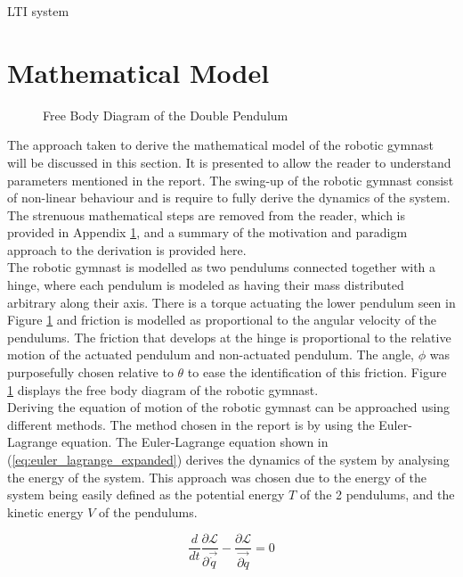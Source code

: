 LTI system


\section{Mathematical Model}
\label{sec:math_model}
\begin{figure}[h]
	\centering
	
	\caption{Free Body Diagram of the Double Pendulum}
	\label{fig:doublePen}
\end{figure}

The approach taken to derive the mathematical model of the robotic gymnast will be discussed in this section. It is presented to allow the reader to understand parameters mentioned in the report. The swing-up of the robotic gymnast consist of non-linear behaviour and is require to fully derive the dynamics of the system. The strenuous mathematical steps are removed from the reader, which is provided in Appendix \ref{sec:math_model}, and a summary of the motivation and paradigm approach to the derivation is provided here.\\

The robotic gymnast is modelled as two pendulums connected together with a hinge, where each pendulum is modeled as having their mass distributed arbitrary along their axis. There is a torque actuating the lower pendulum seen in Figure \ref{fig:doublePen} and friction is modelled as proportional to the angular velocity of the pendulums. The friction that develops at the hinge is proportional to the relative motion of the actuated pendulum and non-actuated pendulum. The angle, $\phi$ was purposefully chosen relative to $\theta$ to ease the identification of this friction. Figure \ref{fig:doublePen} displays the free body diagram of the robotic gymnast.\\

Deriving the equation of motion of the robotic gymnast can be approached using different methods. The method chosen in the report is by using the Euler-Lagrange equation. The Euler-Lagrange equation shown in (\ref{eq:euler_lagrange_expanded}) derives the dynamics of the system by analysing the energy of the system.  This approach was chosen due to the energy of the system being easily defined as the potential energy $T$ of the 2 pendulums, and the kinetic energy $V$ of the pendulums.
 
\begin{equation} \label{eq:euler_lagrange_expanded}
\frac{d}{dt}\frac{\partial\mathcal{L}}{\partial\vec{\dot{q}}}-\frac{\partial\mathcal{L}}{ \vec{\partial q}} = 0
\end{equation}

